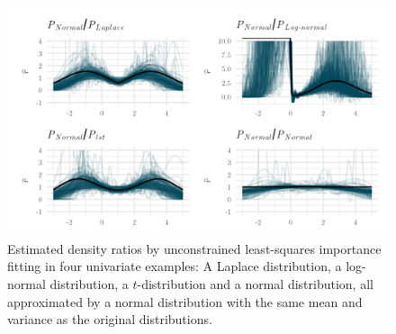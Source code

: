 \documentclass[
]{template/style/uneceart}
\begin{document}
\begin{figure}[t]

{\centering \includegraphics[width=1\textwidth,height=\textheight]{dr-utility-volker-kesteren_files/figure-pdf/fig-sim-dr-1.png}

}

\caption{\label{fig-sim-dr}Estimated density ratios by unconstrained
least-squares importance fitting in four univariate examples: A Laplace
distribution, a log-normal distribution, a \(t\)-distribution and a
normal distribution, all approximated by a normal distribution with the
same mean and variance as the original distributions.}

\end{figure}
\end{document}
